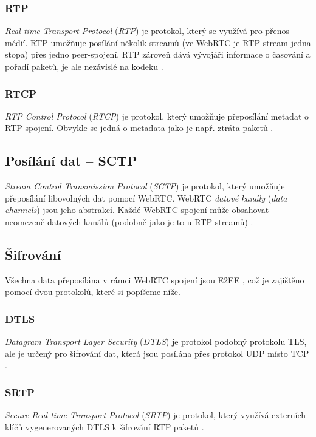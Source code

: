 \subsubsection{RTP}\label{rtp}

\textit{Real-time Transport Protocol} (\textit{RTP}) je protokol, který se
využívá pro přenos médií. RTP umožňuje posílání několik streamů (ve WebRTC je
RTP stream jedna stopa) přes jedno peer-spojení. RTP zároveň dává vývojáři
informace o časování a pořadí paketů, je ale nezávislé na kodeku
\cite{WebRTCForTheCurious}.

\subsubsection{RTCP}\label{rtcp}

\textit{RTP Control Protocol} (\textit{RTCP}) je protokol, který umožňuje
přeposílání metadat o RTP spojení. Obvykle se jedná o metadata jako je např.
ztráta paketů \cite{WebRTCForTheCurious}.

\subsection{Posílání dat -- SCTP}\label{sctp}

\textit{Stream Control Transmission Protocol} (\textit{SCTP}) je protokol, který
umožňuje přeposílání libovolných dat pomocí WebRTC. WebRTC \textit{datové
	kanály} (\textit{data channels}) jsou jeho abstrakcí. Každé WebRTC spojení může
obsahovat neomezeně datových kanálů (podobně jako je to u RTP streamů)
\cite{WebRTCForTheCurious}.

\subsection{Šifrování}

Všechna data přeposílána v rámci WebRTC spojení jsou E2EE
\cite{WebRTCForTheCurious}, což je zajištěno pomocí dvou protokolů, které si
popíšeme níže.

\subsubsection{DTLS}

\textit{Datagram Transport Layer Security} (\textit{DTLS}) je protokol podobný
protokolu TLS, ale je určený pro šifrování dat, která jsou posílána přes
protokol UDP místo TCP \cite{WebRTCForTheCurious}.

\subsubsection{SRTP}\label{srtp}

\textit{Secure Real-time Transport Protocol} (\textit{SRTP}) je protokol, který
využívá externích klíčů vygenerovaných DTLS k šifrování RTP paketů
\cite{WebRTCForTheCurious}.
